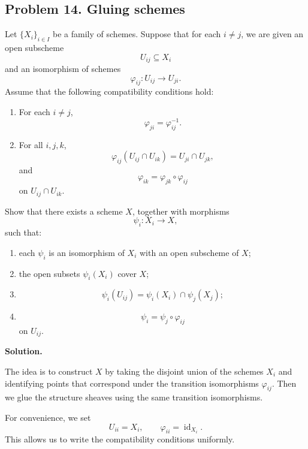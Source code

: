 
\subsection*{Problem 14. Gluing schemes}

Let \(\{X_i\}_{i\in I}\) be a family of schemes. Suppose that for each \(i\neq j\), we are given an open subscheme
\[
U_{ij}\subseteq X_i
\]
and an isomorphism of schemes
\[
\varphi_{ij}:U_{ij}\to U_{ji}.
\]
Assume that the following compatibility conditions hold:

\begin{enumerate}[label=\textup{(\arabic*)}]
	\item For each \(i\neq j\),
	\[
	\varphi_{ji}=\varphi_{ij}^{-1}.
	\]
	
	\item For all \(i,j,k\),
	\[
	\varphi_{ij}(U_{ij}\cap U_{ik})
	=
	U_{ji}\cap U_{jk},
	\]
	and
	\[
	\varphi_{ik}
	=
	\varphi_{jk}\circ \varphi_{ij}
	\]
	on \(U_{ij}\cap U_{ik}\).
\end{enumerate}

Show that there exists a scheme \(X\), together with morphisms
\[
\psi_i:X_i\to X,
\]
such that:

\begin{enumerate}[label=\textup{(\arabic*)}]
	\item each \(\psi_i\) is an isomorphism of \(X_i\) with an open subscheme of \(X\);
	
	\item the open subsets \(\psi_i(X_i)\) cover \(X\);
	
	\item
	\[
	\psi_i(U_{ij})
	=
	\psi_i(X_i)\cap \psi_j(X_j);
	\]
	
	\item
	\[
	\psi_i
	=
	\psi_j\circ \varphi_{ij}
	\]
	on \(U_{ij}\).
\end{enumerate}

\textbf{Solution.}

The idea is to construct \(X\) by taking the disjoint union of the schemes \(X_i\) and identifying points that correspond under the transition isomorphisms \(\varphi_{ij}\). Then we glue the structure sheaves using the same transition isomorphisms.

For convenience, we set
\[
U_{ii}=X_i,
\qquad
\varphi_{ii}=\operatorname{id}_{X_i}.
\]
This allows us to write the compatibility conditions uniformly.

